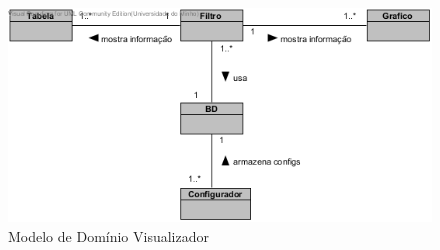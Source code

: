 \begin{figure}
	\centering	
	\includegraphics[scale=0.8]{images/ModelosDeDominio/Visualizador.png}
	\caption{Modelo de Domínio Visualizador}
\end{figure}


\pagebreak
